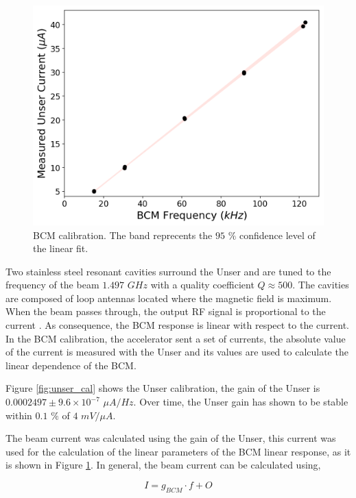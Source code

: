 \documentclass[final,5p,times,twocolumn,balance]{elsarticle}
\begin{document}
\begin{figure}[!h]
      \centering
    \includegraphics[width=\linewidth]{images/dnew_calibration.pdf}
    \caption{BCM calibration. The band reprecents the $95$ $\%$ confidence level of the linear fit.}
    \label{fig:dnew_cal}
\end{figure}

Two stainless steel resonant cavities surround the Unser and are tuned to the frequency of the beam $1.497$ $GHz$ with a quality coefficient $Q \approx 500$.    The cavities are composed of loop antennas located where the magnetic field is maximum. When the beam passes through, the output RF signal is proportional to the current \cite{denard}. As consequence, the BCM response is linear with respect to the current. In the BCM calibration, the accelerator sent a set of currents, the absolute value of the current is measured with the Unser and its values are used to calculate the linear dependence of the BCM.


Figure \ref{fig:unser_cal} shows the Unser calibration, the gain of the Unser is $0.0002497 \pm 9.6 \times 10^{-7} $ $\mu A/Hz$. Over time, the Unser gain has shown to be stable within $0.1$ $\%$ of $4$ $mV/\mu A$. 

The beam current was calculated using the gain of the Unser, this current was used for the calculation of the linear parameters of the BCM linear response, as it is shown in Figure \ref{fig:dnew_cal}. In general, the beam current can be calculated using,

\begin{equation}
I = g_{BCM}\cdot f+O
\label{eq:current_calc}
\end{equation}
\end{document}
